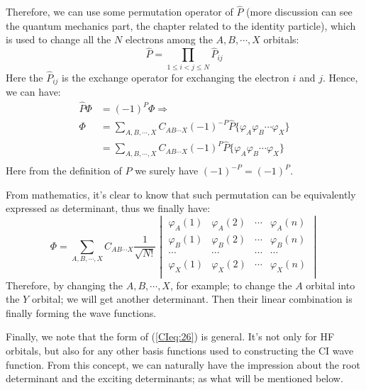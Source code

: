 Therefore, we can use some permutation operator of $\hat{P}$ (more
discussion can see the quantum mechanics part, the chapter related to
the identity particle), which is used to change all the $N$ electrons
among the $A, B, \cdots, X$ orbitals:
\begin{equation}\label{}
  \hat{P} = \prod_{1\leq i<j\leq N}\hat{P}_{ij}
\end{equation}
Here the $\hat{P}_{ij}$ is the exchange operator for exchanging the
electron $i$ and $j$. Hence, we can have:
\begin{align}\label{}
  \hat{P}\Phi &= (-1)^{P}\Phi \Rightarrow \nonumber \\
  \Phi &=\sum_{A,B, \cdots, X}C_{AB\cdots
    X}(-1)^{-P}\hat{P}\{\varphi_{A}\varphi_{B}\cdots\varphi_{X}\}
  \nonumber \\
  &=\sum_{A,B, \cdots, X}C_{AB\cdots
    X}(-1)^{P}\hat{P}\{\varphi_{A}\varphi_{B}\cdots\varphi_{X}\}
  \nonumber \\
\end{align}
Here from the definition of $P$ we surely have $(-1)^{-P} = (-1)^{P}$.

From mathematics, it's clear to know that such permutation can be
equivalently expressed as determinant, thus we finally have:
\begin{equation}\label{CIeq:26}
  \Phi = \sum_{A,B, \cdots, X}C_{AB\cdots X}
  \frac{1}{\sqrt{N!}}\begin{vmatrix}
    \varphi_{A}(1) & \varphi_{A}(2) & \cdots & \varphi_{A}(n) \\
    \varphi_{B}(1) & \varphi_{B}(2) & \cdots & \varphi_{B}(n) \\
    \cdots & \cdots & \cdots & \cdots \\
    \varphi_{X}(1) & \varphi_{X}(2) & \cdots & \varphi_{X}(n) \\
  \end{vmatrix}
\end{equation}
Therefore, by changing the $A,B, \cdots, X$, for example; to change
the $A$ orbital into the $Y$ orbital; we will get another
determinant. Then their linear combination is finally forming the wave
functions.

Finally, we note that the form of (\ref{CIeq:26}) is general. It's not
only for HF orbitals, but also for any other basis functions used to
constructing the CI wave function. From this concept, we can naturally
have the impression about the root determinant and the exciting
determinants; as what will be mentioned below.


